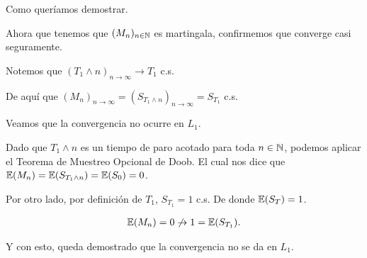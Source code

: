 \begin{itemize}
			Como queríamos demostrar.
	\end{itemize}
	
	Ahora que tenemos que $(M_n)_{n \in \mathbb{N}}$ es martingala, confirmemos que converge casi seguramente.\pn
	
	Notemos que $(T_1 \wedge n)_{n \rightarrow \infty} \rightarrow T_1$ c.s.\pn
	
	De aquí que $(M_n)_{n \rightarrow \infty} = (S_{T_1 \wedge n})_{n \rightarrow \infty} = S_{T_1}$ c.s.\pn				
	
	Veamos que la convergencia no ocurre en $L_1$.\pn
				
	Dado que $T_1 \wedge n$ es un tiempo de paro acotado para toda $n \in \mathbb{N}$,
	podemos aplicar el Teorema de Muestreo Opcional de 	Doob. 
	El cual nos dice que $\mathbb{E}(M_n) = \mathbb{E}(S_{T_1 \wedge n}) = \mathbb{E}(S_0) = 0$.\pn
	
	Por otro lado, por definición de $T_1$, $S_{T_1} = 1$ c.s.	De donde $\mathbb{E}(S_T) = 1$.
	
	\begin{align}
		\mathbb{E}(M_n) = 0 \not\rightarrow 1 = \mathbb{E}(S_{T_1}).
	\end{align}\pn			
	
	Y con esto, queda demostrado que la convergencia no se da en $L_1$.	